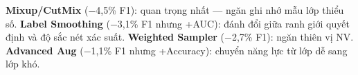 \textbf{Mixup/CutMix} ($-$4,5\% F1): quan trọng nhất --- ngăn ghi nhớ mẫu lớp thiểu số. \textbf{Label Smoothing} ($-$3,1\% F1 nhưng +AUC): đánh đổi giữa ranh giới quyết định và độ sắc nét xác suất. \textbf{Weighted Sampler} ($-$2,7\% F1): ngăn thiên vị NV. \textbf{Advanced Aug} ($-$1,1\% F1 nhưng +Accuracy): chuyển năng lực từ lớp dễ sang lớp khó.
